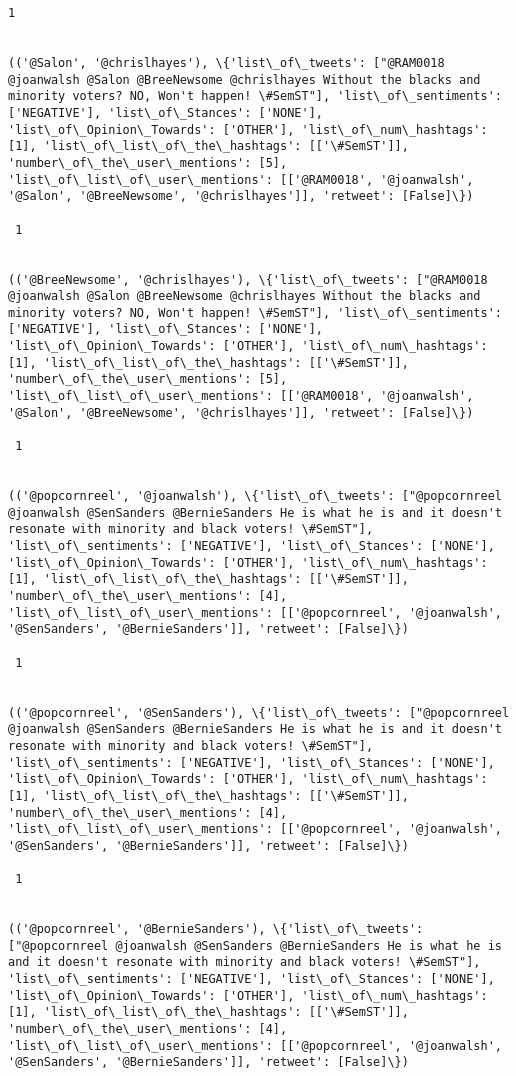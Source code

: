 \documentclass[11pt]{article}
\begin{document}
\begin{Verbatim}[commandchars=\\\{\}]
 1
 

(('@Salon', '@chrislhayes'), \{'list\_of\_tweets': ["@RAM0018 @joanwalsh @Salon @BreeNewsome @chrislhayes Without the blacks and minority voters? NO, Won't happen! \#SemST"], 'list\_of\_sentiments': ['NEGATIVE'], 'list\_of\_Stances': ['NONE'], 'list\_of\_Opinion\_Towards': ['OTHER'], 'list\_of\_num\_hashtags': [1], 'list\_of\_list\_of\_the\_hashtags': [['\#SemST']], 'number\_of\_the\_user\_mentions': [5], 'list\_of\_list\_of\_user\_mentions': [['@RAM0018', '@joanwalsh', '@Salon', '@BreeNewsome', '@chrislhayes']], 'retweet': [False]\})

 1
 

(('@BreeNewsome', '@chrislhayes'), \{'list\_of\_tweets': ["@RAM0018 @joanwalsh @Salon @BreeNewsome @chrislhayes Without the blacks and minority voters? NO, Won't happen! \#SemST"], 'list\_of\_sentiments': ['NEGATIVE'], 'list\_of\_Stances': ['NONE'], 'list\_of\_Opinion\_Towards': ['OTHER'], 'list\_of\_num\_hashtags': [1], 'list\_of\_list\_of\_the\_hashtags': [['\#SemST']], 'number\_of\_the\_user\_mentions': [5], 'list\_of\_list\_of\_user\_mentions': [['@RAM0018', '@joanwalsh', '@Salon', '@BreeNewsome', '@chrislhayes']], 'retweet': [False]\})

 1
 

(('@popcornreel', '@joanwalsh'), \{'list\_of\_tweets': ["@popcornreel @joanwalsh @SenSanders @BernieSanders He is what he is and it doesn't resonate with minority and black voters! \#SemST"], 'list\_of\_sentiments': ['NEGATIVE'], 'list\_of\_Stances': ['NONE'], 'list\_of\_Opinion\_Towards': ['OTHER'], 'list\_of\_num\_hashtags': [1], 'list\_of\_list\_of\_the\_hashtags': [['\#SemST']], 'number\_of\_the\_user\_mentions': [4], 'list\_of\_list\_of\_user\_mentions': [['@popcornreel', '@joanwalsh', '@SenSanders', '@BernieSanders']], 'retweet': [False]\})

 1
 

(('@popcornreel', '@SenSanders'), \{'list\_of\_tweets': ["@popcornreel @joanwalsh @SenSanders @BernieSanders He is what he is and it doesn't resonate with minority and black voters! \#SemST"], 'list\_of\_sentiments': ['NEGATIVE'], 'list\_of\_Stances': ['NONE'], 'list\_of\_Opinion\_Towards': ['OTHER'], 'list\_of\_num\_hashtags': [1], 'list\_of\_list\_of\_the\_hashtags': [['\#SemST']], 'number\_of\_the\_user\_mentions': [4], 'list\_of\_list\_of\_user\_mentions': [['@popcornreel', '@joanwalsh', '@SenSanders', '@BernieSanders']], 'retweet': [False]\})

 1
 

(('@popcornreel', '@BernieSanders'), \{'list\_of\_tweets': ["@popcornreel @joanwalsh @SenSanders @BernieSanders He is what he is and it doesn't resonate with minority and black voters! \#SemST"], 'list\_of\_sentiments': ['NEGATIVE'], 'list\_of\_Stances': ['NONE'], 'list\_of\_Opinion\_Towards': ['OTHER'], 'list\_of\_num\_hashtags': [1], 'list\_of\_list\_of\_the\_hashtags': [['\#SemST']], 'number\_of\_the\_user\_mentions': [4], 'list\_of\_list\_of\_user\_mentions': [['@popcornreel', '@joanwalsh', '@SenSanders', '@BernieSanders']], 'retweet': [False]\})


\end{Verbatim}
\end{document}
